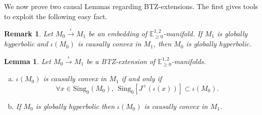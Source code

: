 \documentclass[a4paper,12pt]{article}
\def\sing{\mathrm{Sing}}
\newcommand{\mass}[1]{{\mathbb E}^{1,2}_{#1}}
\newtheorem{lemou}{Lemma}[section]          %
\newtheorem{remark}{Remark}             %
\begin{document}
We now prove two causal Lemmas regarding BTZ-extensions. The first gives tools to exploit the following easy fact.
		\begin{remark}\label{btzrem:embedding_manifold_globally_hyperbolic}  Let $M_0 \xrightarrow{\iota} M_1$ be an embedding of $\mass{\geq0}$-manifold.
		 If $M_1$ is globally hyperbolic and $\iota(M_0)$ is causally convex in $M_1$, then $M_0$ is globally hyperbolic.
		\end{remark}

		
\begin{lemou}\label{btzlem:BTZext_caus_conv}\label{lem:BTZext_caus_conv}
	Let $M_0\xrightarrow{\iota} M_1$ be a BTZ-extension of $\mass{\geq0}$-manifolds. 
	\begin{enumerate}[(a)]
	\item $\iota(M_0)$ is causally convex in $M_1$ if and only if  $$\forall x\in \sing_0(M_0), ~~\sing_0\left[J^+(\iota(x))\right] \subset \iota(M_0).$$ 
	\item If $M_0$ is globally hyperbolic then $\iota(M_0)$ is causally convex in $M_1$.
	
	\end{enumerate}
\end{lemou}
\end{document}
